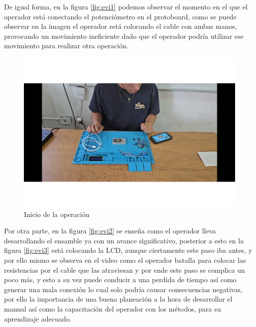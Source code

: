     
    
    De igual forma, en la figura \ref{fig:evi1} podemos observar el momento en  el que el operador está conectando el potenciómetro en el protoboard, como se puede observar en la imagen el operador está colocando el cable con ambas manos, provocando un movimiento ineficiente dado que el operador podría utilizar ese movimiento para realizar otra operación.
    
    
    \begin{figure}[H]
        \centering
        \includegraphics[trim = {25mm 40mm 25mm 10mm},clip,scale=0.3]{22/Img/e1.pdf}
        \caption{Inicio de la operación}
        \label{fig:evi0}
    \end{figure}
    
    
    
    Por otra parte, en la figura \ref{fig:evi2} se enseña como el operador lleva desarrollando el ensamble ya con un avance significativo, posterior a esto en la figura \ref{fig:evi3} está colocando la LCD, aunque ciertamente este paso iba antes, y por ello mismo se observa en el video como el operador batalla para colocar las resistencias por el cable que las atraviesan y por ende este paso se complica un poco más, y esto a su vez puede conducir a una perdida de tiempo así como generar una mala conexión lo cual solo podría causar consecuencias negativas, por ello la importancia de una buena planeación a la hora de desarrollar el manual así como la capacitación del operador con los métodos, para su aprendizaje adecuado.
    
    
       
